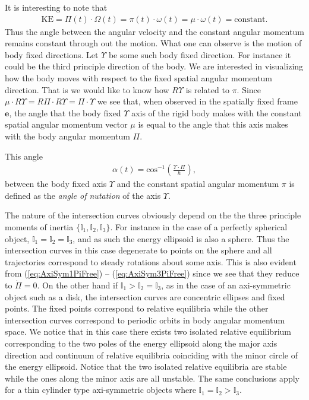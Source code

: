 \documentclass[graybox,envcountchap,sectrefs]{svmonoMuga}
\begin{document}
It is interesting to note that 
\begin{align}
\mathrm{KE}=\Pi(t)\cdot\Omega(t)=\pi(t)\cdot \omega(t)=\mu\cdot \omega(t)=\mathrm{constant}.
\end{align}
Thus the angle between the angular velocity and the constant angular momentum remains constant through out the motion. What one can observe is the motion of body fixed directions.  Let $\Upsilon$ be some such body fixed direction. For instance it could be the third principle direction of the body. We are interested in visualizing how the body moves with respect to the fixed spatial angular momentum direction. That is we would like to know how $R\Upsilon$ is related to $\pi$.
Since $\mu \cdot R\Upsilon=R\Pi \cdot R\Upsilon=\Pi \cdot \Upsilon$ we see that, when observed in the spatially fixed frame $\mathbf{e}$, the angle that the body fixed $\Upsilon$ axis of the rigid 
body makes with the constant spatial angular momentum vector $\mu$ is equal to the angle that this axis makes with the body angular momentum $\Pi$. 
\begin{svgraybox}
This angle  
\begin{align}
\alpha(t)=\mathrm{cos}^{-1}\left(\frac{\Upsilon \cdot \Pi}{h}\right),\label{eq:NutationAngle}
\end{align}
between the body fixed axis $\Upsilon$ and the constant spatial angular momentum $\pi$ is defined as the \textit{angle of nutation} of the axis $\Upsilon$.
\end{svgraybox}

The nature of the intersection curves obviously depend on the the three principle moments of inertia $\{\mathbb{I}_1,\mathbb{I}_2,\mathbb{I}_3\}$. For instance in the case of a perfectly spherical object,  $\mathbb{I}_1=\mathbb{I}_2=\mathbb{I}_3$, and as such the energy ellipsoid is also a sphere. Thus the intersection curves in this case degenerate to points on the sphere and all trajectories correspond to steady rotations about some axis. This is also evident from (\ref{eq:AxiSym1PiFree}) -- (\ref{eq:AxiSym3PiFree}) since we see that they reduce to $\dot{\Pi}=0$.
On the other hand if $\mathbb{I}_1>\mathbb{I}_2=\mathbb{I}_3$, as in the case of an axi-symmetric object such as a disk, the intersection curves are concentric ellipses and fixed points. The fixed points correspond to relative equilibria while the other intersection curves correspond to periodic orbits in body angular momentum space. We notice that in this case there exists two isolated relative equilibrium corresponding to the two poles of the energy ellipsoid along the major axis direction and continuum of relative equilibria coinciding with the minor circle of the energy ellipsoid. Notice that the two isolated relative equilibria are stable while the ones along the minor axis are all unstable. The same conclusions apply for a thin cylinder type axi-symmetric objects where $\mathbb{I}_1=\mathbb{I}_2>\mathbb{I}_3$.
\end{document}
